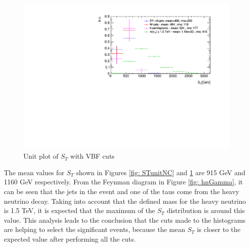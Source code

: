 \begin{figure}
\centering
\includegraphics[width=\linewidth]{Plots/ST_unitVBF.pdf}
\caption{Unit plot of $S_{T}$ with VBF cuts}
\label{fig: STunitVBF}
\end{figure}

The mean values for $S_{T}$ shown in Figures \ref{fig: STunitNC} and \ref{fig: STunitVBF} are 915 GeV and 1160 GeV respectively. From the Feynman diagram in Figure \ref{fig: hnGamma}, it can be seen that the jets in the event and one of the taus come from the heavy neutrino decay. Taking into account that the defined mass for the heavy neutrino is 1.5 TeV, it is expected that the maximum of the $S_{T}$ distribution is around this value. This analysis leads to the conclusion that the cuts made to the histograms are helping to select the significant events, because the mean $S_{T}$ is closer to the expected value after performing all the cuts.





